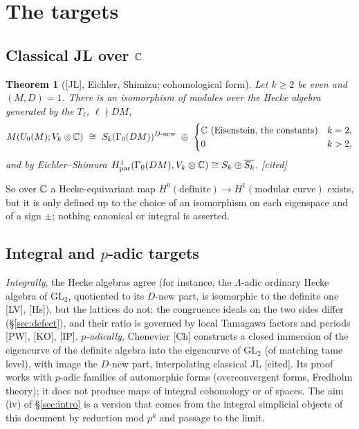 \documentclass[11pt]{amsart}
\theoremstyle{plain}
\newtheorem{theorem}{Theorem}[section]
\theoremstyle{definition}
\theoremstyle{remark}
\newcommand{\status}[1]{\textup{\textsf{[#1]}}}
\newcommand{\stcited}{\status{cited}}
\newcommand{\GL}{\mathrm{GL}}\newcommand{\SL}{\mathrm{SL}}\newcommand{\PGL}{\mathrm{PGL}}
\begin{document}
\section{The targets}\label{sec:targets}

\subsection{Classical JL over $\mathbb{C}$}
\begin{theorem}[{[JL], Eichler, Shimizu; cohomological form}]\label{thm:JLclassical}
Let $k\ge2$ be even and $(M,D)=1$. There is an isomorphism of modules over the Hecke algebra generated by the $T_\ell$, $\ell\nmid DM$,
\[M(U_0(M);V_k\otimes\C)\ \cong\ S_k(\Gamma_0(DM))^{D\text{-new}}\ \oplus\ \begin{cases}\C\ (\text{Eisenstein, the constants})&k=2,\\0&k>2,\end{cases}\]
and by Eichler--Shimura $H^1_{\rm par}(\Gamma_0(DM),V_k\otimes\mathbb{C})\cong S_k\oplus\overline{S_k}$. \stcited
\end{theorem}
So over $\mathbb{C}$ a Hecke-equivariant map $H^0(\text{definite})\to H^1(\text{modular curve})$ exists, but it is only defined up to the choice of an isomorphism on each eigenspace and of a sign $\pm$; nothing canonical or integral is asserted.

\subsection{Integral and $p$-adic targets}
\emph{Integrally}, the Hecke algebras agree (for instance, the $\Lambda$-adic ordinary Hecke algebra of $\GL_2$, quotiented to its $D$-new part, is isomorphic to the definite one [LV], [Hs]), but the lattices do not: the congruence ideals on the two sides differ (\S\ref{sec:defect}), and their ratio is governed by local Tamagawa factors and periods [PW], [KO], [IP].
\emph{$p$-adically}, Chenevier [Ch] constructs a closed immersion of the eigencurve of the definite algebra into the eigencurve of $\GL_2$ (of matching tame level), with image the $D$-new part, interpolating classical JL \stcited. Its proof works with $p$-adic families of automorphic forms (overconvergent forms, Fredholm theory); it does not produce maps of integral cohomology or of spaces.
The aim (iv) of \S\ref{sec:intro} is a version that comes from the integral simplicial objects of this document by reduction mod $p^k$ and passage to the limit.
\end{document}
